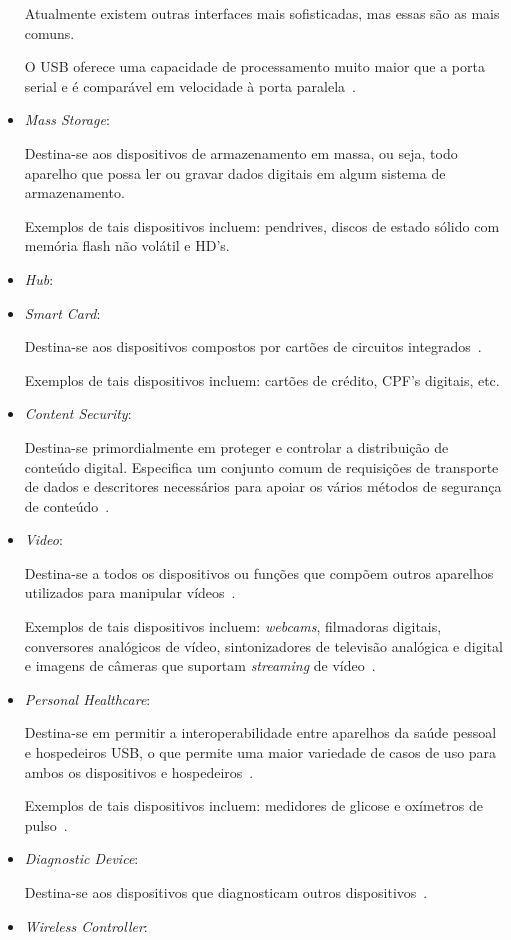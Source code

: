 \begin{itemize}
	Atualmente existem outras interfaces mais sofisticadas, mas essas são as mais comuns.

	O USB oferece uma capacidade de processamento muito maior que a porta serial e é comparável em velocidade à porta paralela~\cite{usbprintclass}.
	\item \emph{Mass Storage}: 

	Destina-se aos dispositivos de armazenamento em massa, ou seja, todo aparelho que possa ler ou gravar dados digitais em algum sistema de armazenamento.

	Exemplos de tais dispositivos incluem: pendrives, discos de estado sólido com memória flash não volátil e HD's.
	\item \emph{Hub}: 
	\item \emph{Smart Card}: 

	Destina-se aos dispositivos compostos por cartões de circuitos integrados~\cite{usbsmartcard}.

	Exemplos de tais dispositivos incluem: cartões de crédito, CPF's digitais, etc.
	\item \emph{Content Security}: 

	Destina-se primordialmente em proteger e controlar a distribuição de conteúdo digital. Especifica um conjunto comum de requisições de transporte de dados e descritores necessários para apoiar os vários métodos de segurança de conteúdo~\cite{usbcontentsecurityclass}.
	\item \emph{Video}: 

	Destina-se a todos os dispositivos ou funções que compõem outros aparelhos utilizados para manipular vídeos~\cite{usbvideoclass}.

	Exemplos de tais dispositivos incluem: \emph{webcams}, filmadoras digitais, conversores analógicos de vídeo, sintonizadores de televisão analógica e digital e imagens de câmeras que suportam \emph{streaming} de vídeo~\cite{usbvideoclass}.
	\item \emph{Personal Healthcare}: 

	Destina-se em permitir a interoperabilidade entre aparelhos da saúde pessoal e hospedeiros USB, o que permite uma maior variedade de casos de uso para ambos os dispositivos e hospedeiros~\cite{usbhealthcareclass}.

	Exemplos de tais dispositivos incluem: medidores de glicose e oxímetros de pulso~\cite{usbhealthcareclass}.
	\item \emph{Diagnostic Device}:

	Destina-se aos dispositivos que diagnosticam outros dispositivos~\cite{usbclasscodes}.
	\item \emph{Wireless Controller}: 


\end{itemize}
